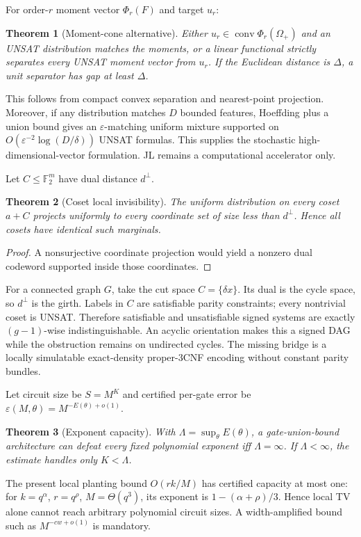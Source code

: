 \documentclass[11pt]{article}
\newtheorem{theorem}{Theorem}
\begin{document}
For order-$r$ moment vector $\Phi_r(F)$ and target $u_r$:
\begin{theorem}[Moment-cone alternative]
Either $u_r\in\operatorname{conv}\Phi_r(\Omega_+)$ and an UNSAT distribution matches the moments, or a linear functional strictly separates every UNSAT moment vector from $u_r$. If the Euclidean distance is $\Delta$, a unit separator has gap at least $\Delta$.
\end{theorem}
This follows from compact convex separation and nearest-point projection. Moreover, if any distribution matches $D$ bounded features, Hoeffding plus a union bound gives an $\varepsilon$-matching uniform mixture supported on $O(\varepsilon^{-2}\log(D/\delta))$ UNSAT formulas. This supplies the stochastic high-dimensional-vector formulation. JL remains a computational accelerator only.

Let $C\le\mathbb F_2^m$ have dual distance $d^\perp$.
\begin{theorem}[Coset local invisibility]
The uniform distribution on every coset $a+C$ projects uniformly to every coordinate set of size less than $d^\perp$. Hence all cosets have identical such marginals.
\end{theorem}
\begin{proof}A nonsurjective coordinate projection would yield a nonzero dual codeword supported inside those coordinates.\end{proof}
For a connected graph $G$, take the cut space $C=\{\delta x\}$. Its dual is the cycle space, so $d^\perp$ is the girth. Labels in $C$ are satisfiable parity constraints; every nontrivial coset is UNSAT. Therefore satisfiable and unsatisfiable signed systems are exactly $(g-1)$-wise indistinguishable. An acyclic orientation makes this a signed DAG while the obstruction remains on undirected cycles. The missing bridge is a locally simulatable exact-density proper-3CNF encoding without constant parity bundles.

Let circuit size be $S=M^K$ and certified per-gate error be $\varepsilon(M,\theta)=M^{-E(\theta)+o(1)}$.
\begin{theorem}[Exponent capacity]
With $\Lambda=\sup_\theta E(\theta)$, a gate-union-bound architecture can defeat every fixed polynomial exponent iff $\Lambda=\infty$. If $\Lambda<\infty$, the estimate handles only $K<\Lambda$.
\end{theorem}
The present local planting bound $O(rk/M)$ has certified capacity at most one: for $k=q^\alpha$, $r=q^\rho$, $M=\Theta(q^3)$, its exponent is $1-(\alpha+\rho)/3$. Hence local TV alone cannot reach arbitrary polynomial circuit sizes. A width-amplified bound such as $M^{-cw+o(1)}$ is mandatory.
\end{document}
